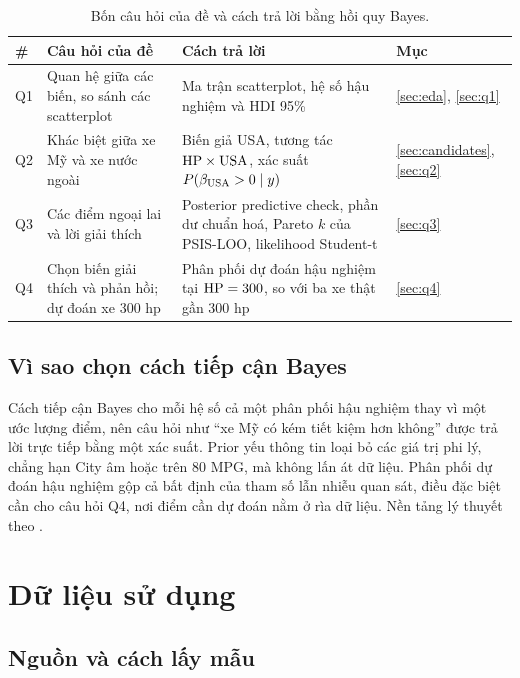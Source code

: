 \documentclass[12pt,a4paper]{report}
\begin{document}
\begin{table}[tp]
  \centering
  \caption{Bốn câu hỏi của đề và cách trả lời bằng hồi quy Bayes.}
  \label{tab:questions}
  \begin{tabular}{l>{\raggedright}p{5.2cm}>{\raggedright}p{7.6cm}l}
    \toprule
    \# & Câu hỏi của đề & Cách trả lời & Mục \\
    \midrule
    Q1 & Quan hệ giữa các biến, so sánh các scatterplot
       & Ma trận scatterplot, hệ số hậu nghiệm và HDI 95\% & \ref{sec:eda}, \ref{sec:q1} \\
    Q2 & Khác biệt giữa xe Mỹ và xe nước ngoài
       & Biến giả USA, tương tác $\mathrm{HP} \times \mathrm{USA}$, xác suất $P(\beta_{\mathrm{USA}} > 0 \mid y)$
       & \ref{sec:candidates}, \ref{sec:q2} \\
    Q3 & Các điểm ngoại lai và lời giải thích
       & Posterior predictive check, phần dư chuẩn hoá, Pareto $k$ của PSIS-LOO, likelihood Student-t
       & \ref{sec:q3} \\
    Q4 & Chọn biến giải thích và phản hồi; dự đoán xe 300 hp
       & Phân phối dự đoán hậu nghiệm tại $\mathrm{HP} = 300$, so với ba xe thật gần 300 hp
       & \ref{sec:q4} \\
    \bottomrule
  \end{tabular}
\end{table}

\section{Vì sao chọn cách tiếp cận Bayes}

Cách tiếp cận Bayes cho mỗi hệ số cả một phân phối hậu nghiệm thay vì một ước
lượng điểm, nên câu hỏi như ``xe Mỹ có kém tiết kiệm hơn không'' được trả lời
trực tiếp bằng một xác suất. Prior yếu thông tin loại bỏ các giá trị phi lý,
chẳng hạn City âm hoặc trên 80 MPG, mà không lấn át dữ liệu. Phân phối dự đoán
hậu nghiệm gộp cả bất định của tham số lẫn nhiễu quan sát, điều đặc biệt cần
cho câu hỏi Q4, nơi điểm cần dự đoán nằm ở rìa dữ liệu. Nền tảng lý thuyết theo
\cite{gelman2013bda, mcelreath2020rethinking}.

\chapter{Dữ liệu sử dụng}
\label{sec:data}

\section{Nguồn và cách lấy mẫu}
\end{document}
